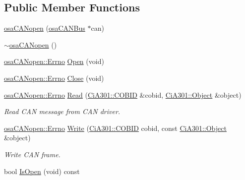 \subsection*{Public Member Functions}
\begin{DoxyCompactItemize}
\item 
\hyperlink{classosa_c_a_nopen_a39228333ca59210a4d0eb3227b857adb}{osa\-C\-A\-Nopen} (\hyperlink{classosa_c_a_n_bus}{osa\-C\-A\-N\-Bus} $\ast$can)
\item 
\hyperlink{classosa_c_a_nopen_a2282ff320ac3d2149e517f296c43d161}{$\sim$osa\-C\-A\-Nopen} ()
\item 
\hyperlink{classosa_c_a_nopen_a5bf7839b2a382734c2f745e50ea7cfa0}{osa\-C\-A\-Nopen\-::\-Errno} \hyperlink{classosa_c_a_nopen_a051b423cffb19605b24deadba7e50eb2}{Open} (void)
\item 
\hyperlink{classosa_c_a_nopen_a5bf7839b2a382734c2f745e50ea7cfa0}{osa\-C\-A\-Nopen\-::\-Errno} \hyperlink{classosa_c_a_nopen_a35966647d08373baf0071864b79535ef}{Close} (void)
\item 
\hyperlink{classosa_c_a_nopen_a5bf7839b2a382734c2f745e50ea7cfa0}{osa\-C\-A\-Nopen\-::\-Errno} \hyperlink{classosa_c_a_nopen_afda6b68171e636e7b27abf1a7cc79aff}{Read} (\hyperlink{namespace_ci_a301_aec5b5dbb2b60d2837c60499f6f297aa7}{Ci\-A301\-::\-C\-O\-B\-I\-D} \&cobid, \hyperlink{struct_ci_a301_1_1_object}{Ci\-A301\-::\-Object} \&object)
\begin{DoxyCompactList}\small\item\em Read C\-A\-N message from C\-A\-N driver. \end{DoxyCompactList}\item 
\hyperlink{classosa_c_a_nopen_a5bf7839b2a382734c2f745e50ea7cfa0}{osa\-C\-A\-Nopen\-::\-Errno} \hyperlink{classosa_c_a_nopen_ae6e94cd07a1b12bb11158cc8936dd9b3}{Write} (\hyperlink{namespace_ci_a301_aec5b5dbb2b60d2837c60499f6f297aa7}{Ci\-A301\-::\-C\-O\-B\-I\-D} cobid, const \hyperlink{struct_ci_a301_1_1_object}{Ci\-A301\-::\-Object} \&object)
\begin{DoxyCompactList}\small\item\em Write C\-A\-N frame. \end{DoxyCompactList}\item 
bool \hyperlink{classosa_c_a_nopen_a34ad912ee7f24e4286c61caae295751a}{Is\-Open} (void) const 
\end{DoxyCompactItemize}


